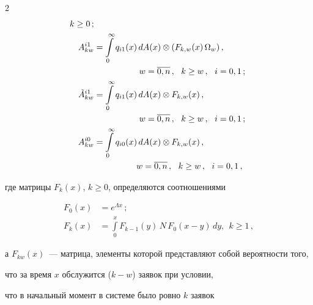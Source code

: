 \begin{multicols}{2}
\begin{align}
\ \ k\ge0\,;\notag


\\


A^{i1}_{kw} & =


\int\limits^\infty_0 q_{i1}(x)\,d A(x)


\otimes (F_{k,w}(x)\, \Omega_{w})\,,\notag\\


&\ \ \ \ \ \ \ \ \ \hspace*{8mm}  w=\overline{0,n}\,, \ \ k \ge w\,, \ \ i=0,1\,;\notag


\\


\Tilde A^{i1}_{kw} & =


\int\limits^\infty_0 q_{i1}(x)\,d A(x)


\otimes F_{k,w}(x)\,,\notag\\


& \ \ \ \ \ \ \ \ \ \hspace*{8mm} w=\overline{0,n}\,, \ \ k \ge w\,, \ \ i=0,1\,;\label{A_3}\\


A^{i0}_{kw} & =


\int\limits^\infty_0 q_{i0}(x)\,d A(x)


\otimes F_{k,w}(x)\,,\notag\\


& \ \ \ \ \ \ \ \ \hspace*{8mm} w=\overline{0,n}\,, \ \ k \ge w\,, \ \ i=0,1\,, \label{A_4}


\end{align}


где матрицы $F_k(x)$, $k\ge 0$, определяются соотношениями


\begin{align}


F_{0}(x)&= e^{\Lambda x}\,; \label{F_0} \\


F_{k}(x) & =


\int\limits^x_0


F_{k-1}(y)\,N\,F_{0}(x-y)\, dy,\ \ k\ge1\,,\label{F_k}


\end{align}


а $F_{kw}(x)$~--- матрица, элементы которой представляют собой вероятности того,


что за время $x$ обслужится ($k-w$) заявок при условии,


что в начальный момент в системе было ровно $k$ заявок



\end{multicols}
